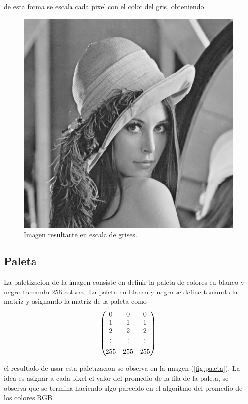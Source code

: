 de esta forma se escala cada pixel con el color del gris, obteniendo

\begin{figure}[H]
	\centering
	\includegraphics[scale=0.5]{imagenes/lennaGrisValores.png}
	\caption{Imagen resultante en escala de grises.}
\end{figure}

\subsection{Paleta}

La paletizacion de la imagen consiste en definir la paleta de colores en blanco y negro tomando 256 colores. La paleta en blanco y negro se define tomando la matriz y asignando la matriz de la paleta como
\begin{equation}
\begin{pmatrix}
\centering
0 & 0 & 0\\
1 & 1 & 1 \\
2 & 2 & 2 \\
\vdots & \vdots & \vdots\\
255 & 255 & 255
\end{pmatrix}
\end{equation}

el resultado de usar esta paletizacion se observa en la imagen (\ref{fig:paleta}). La idea es asignar a cada pixel el valor del promedio de la fila de la paleta, se observa que se termina haciendo algo parecido en el algoritmo del promedio de los colores RGB.

